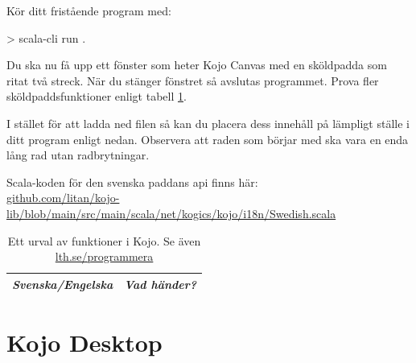Kör ditt fristående program med:
\begin{REPLnonum}
> scala-cli run .
\end{REPLnonum}

Du ska nu få upp ett fönster som heter Kojo Canvas med en sköldpadda som ritat två streck. När du stänger fönstret så avslutas programmet. Prova fler sköldpaddsfunktioner enligt tabell \ref{table:kojo:functions}.

I stället för att ladda ned filen  så kan du placera dess innehåll på lämpligt ställe i ditt program enligt nedan. Observera att raden som börjar med  ska vara en enda lång rad utan radbrytningar.%



\noindent Scala-koden för den svenska paddans api finns här: \\
\href{https://github.com/litan/kojo-lib/blob/main/src/main/scala/net/kogics/kojo/i18n/Swedish.scala}{github.com/litan/kojo-lib/blob/main/src/main/scala/net/kogics/kojo/i18n/Swedish.scala}




{\small\renewcommand{\arraystretch}{1.4}
\begin{longtable}{@{}p{} p{}}

\caption{Ett urval av funktioner i Kojo. Se även \href{http://lth.se/programmera}{lth.se/programmera}}\label{table:kojo:functions}\\

\emph{Svenska/Engelska} & \emph{Vad händer?}  \\ \hline

\end{longtable}
}%


\section{Kojo Desktop}

